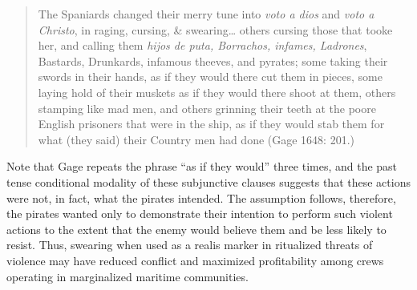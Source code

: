 \begin{quotation}
The Spaniards changed their merry tune into \textit{voto a dios} and \textit{voto a Christo}, in raging, cursing, \& swearing… others cursing those that tooke her, and calling them \textit{hijos de puta, Borrachos, infames, Ladrones}, Bastards, Drunkards, infamous theeves, and pyrates; some taking their swords in their hands, as if they would there cut them in pieces, some laying hold of their muskets as if they would there shoot at them, others stamping like mad men, and others grinning their teeth at the poore English prisoners that were in the ship, as if they would stab them for what (they said) their Country men had done (Gage 1648: 201.)

\end{quotation}
\begin{styleStandard}
Note that Gage repeats the phrase “as if they would” three times, and the past tense conditional modality of these subjunctive clauses suggests that these actions were not, in fact, what the pirates intended. The assumption follows, therefore, the pirates wanted only to demonstrate their intention to perform such violent actions to the extent that the enemy would believe them and be less likely to resist. Thus, swearing when used as a realis marker in ritualized threats of violence may have reduced conflict and maximized profitability among crews operating in marginalized maritime communities. 
\end{styleStandard}


